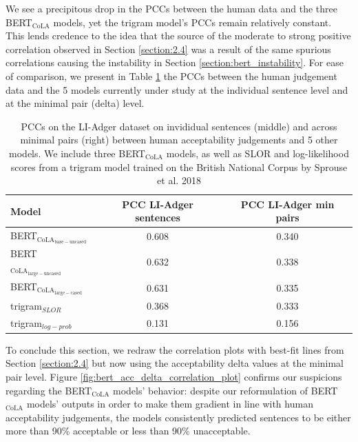 We see a precipitous drop in the PCCs between the human data and the three BERT$_\mathrm{CoLA}$ models, yet the trigram model's PCCs remain relatively constant.  This lends credence to the idea that the source of the moderate to strong positive correlation observed in Section \ref{section:2.4} was a result of the same spurious correlations causing the instability in Section \ref{section:bert_instability}.  For ease of comparison, we present in Table \ref{tab:table_8} the PCCs between the human judgement data and the 5 models currently under study at the individual sentence level and at the minimal pair (delta) level. 

\begin{table}[h]
    \centering
    \begin{tabular}{@{}lcc@{}}
    \toprule
    \textbf{Model} & \textbf{PCC LI-Adger sentences} & \textbf{PCC LI-Adger min pairs}  \\
    \midrule
    BERT$_\mathrm{CoLA_{base-uncased}}$ & 0.608 & 0.340 \\
    BERT$_\mathrm{CoLA_{large-uncased}}$ & 0.632 & 0.338 \\
    BERT$_\mathrm{CoLA_{large-cased}}$ & 0.631 & 0.335 \\
    \midrule
    trigram$_{SLOR}$ & 0.368 & 0.333 \\
    trigram$_{log-prob}$ & 0.131 & 0.156 \\
    \bottomrule
    \end{tabular}
    \caption[PCCs with human data on LI-Adger sentences vs. minimal pairs]{PCCs on the LI-Adger dataset on invididual sentences (middle) and across minimal pairs (right) between human acceptability judgements and 5 other models.  We include three BERT$_\mathrm{CoLA}$ models, as well as SLOR and log-likelihood scores from a trigram model trained on the British National Corpus by Sprouse et al. 2018}
    \label{tab:table_8}
\end{table}

To conclude this section, we redraw the correlation plots with best-fit lines from Section \ref{section:2.4} but now using the acceptability delta values at the minimal pair level.  Figure \ref{fig:bert_acc_delta_correlation_plot} confirms our suspicions regarding the BERT$_\mathrm{CoLA}$ models' behavior: despite our reformulation of BERT$_\mathrm{CoLA}$ models' outputs in order to make them gradient in line with human acceptability judgements, the models consistently predicted sentences to be either more than 90\% acceptable or less than 90\% unacceptable.

